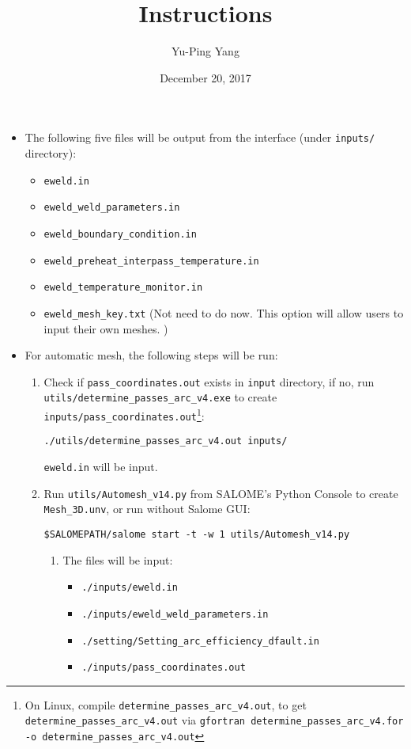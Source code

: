 \documentclass[12pt,letterpaper]{article}
\author{Yu-Ping Yang}
\date{December 20, 2017}
\title{Instructions}
\newcommand{\verbStyle}[1]{{\color{SteelBlue40}\colorbox{LightSteelBlue10}{{#1}}}}
\let\OldTexttt\texttt
\renewcommand{\texttt}[1]{\OldTexttt{\verbStyle{#1}}}
\begin{document}
\maketitle
\begin{itemize}
\item The following five files will be output from the interface (under \texttt{inputs/} directory):
\begin{itemize}
\item \texttt{eweld.in}
\item \texttt{eweld\_weld\_parameters.in}
\item \texttt{eweld\_boundary\_condition.in}
\item \texttt{eweld\_preheat\_interpass\_temperature.in}
\item \texttt{eweld\_temperature\_monitor.in}
\item \texttt{eweld\_mesh\_key.txt} (Not need to do now. This option will allow users to input their own meshes. )
\end{itemize}

\item For automatic mesh, the following steps will be run:
\begin{enumerate}
\item Check if \texttt{pass\_coordinates.out} exists in \texttt{input} directory, if no, run \\
\texttt{utils/determine\_passes\_arc\_v4.exe} to create \texttt{inputs/pass\_coordinates.out}\footnote{On Linux, compile      \texttt{determine\_passes\_arc\_v4.out}, to get \texttt{determine\_passes\_arc\_v4.out} via \texttt{gfortran determine\_passes\_arc\_v4.for -o determine\_passes\_arc\_v4.out}}:
\begin{verbatim}
./utils/determine_passes_arc_v4.out inputs/
\end{verbatim}
\texttt{eweld.in} will be input.
\item Run \texttt{utils/Automesh\_v14.py} from SALOME's Python Console to create \texttt{Mesh\_3D.unv}, or run 
without Salome GUI:
\begin{verbatim}
$SALOMEPATH/salome start -t -w 1 utils/Automesh_v14.py
\end{verbatim}
\begin{enumerate}
\item The files will be input:
\begin{itemize}
\item \texttt{./inputs/eweld.in}
\item \texttt{./inputs/eweld\_weld\_parameters.in}
\item \texttt{./setting/Setting\_arc\_efficiency\_dfault.in}
\item \texttt{./inputs/pass\_coordinates.out}
\end{itemize}


\end{enumerate}
\end{enumerate}
\end{itemize}
\end{document}
